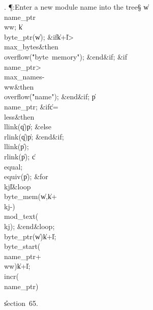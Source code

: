 . \P\?:Enter a new module name into the tree\X\S\?\6
\|w\?\K\?\\{name\_ptr}\?\?\\{ww};\5
\|k\?\K\?\\{byte\_ptr}\?\1(\?\|w\?\2)\?;\6
\&{if}\1\1\8\|k\?+\?\|l\?>\?\\{max\_bytes}\2\8\&{then}\6
\\{overflow}\?\1(\?\.{"byte\ memory"}\?\2)\?;\2\6
\&{end}\8\2\&{if}\1;\6
\&{if}\1\1\8\\{name\_ptr}\?>\?\\{max\_names}\?-\?\\{ww}\2\8\&{then}\6
\\{overflow}\?\1(\?\.{"name"}\?\2)\?;\2\6
\&{end}\8\2\&{if}\1;\6
\|p\?\K\?\\{name\_ptr};\6
\&{if}\1\1\8\|c\?=\?\\{less}\2\8\&{then}\6
\\{llink}\?\1(\?\|q\?\2)\K\?\|p;\6
\4\&{else}\6
\\{rlink}\?\1(\?\|q\?\2)\K\?\|p;\2\6
\&{end}\8\2\&{if}\1;\6
\\{llink}\?\1(\?\|p\?\2)\K{};\5
\\{rlink}\?\1(\?\|p\?\2)\K{};\5
\|c\?\K\?\\{equal};\5
\\{equiv}\?\1(\?\|p\?\2)\K{};\6
\1\&{for}\8\\{kj}\?\in{}\?\to\?\|l\8\&{loop}\6
\\{byte\_mem}\?\1(\?\|w\?,\?\|k\?+\?\\{kj}\?-\?\2)\K\?\\{mod\_text}\?\1(%
\?\\{kj}\?\2)\?;\2\6
\&{end}\8\&{loop};\6
\\{byte\_ptr}\?\1(\?\|w\?\2)\K\?\|k\?+\?\|l;\5
\\{byte\_start}\?\1(\?\\{name\_ptr}\?+\?\\{ww}\?\2)\K\?\|k\?+\?\|l;\5
\\{incr}\?\1(\?\\{name\_ptr}\?\2)\?\par
\U section~65.\fi

